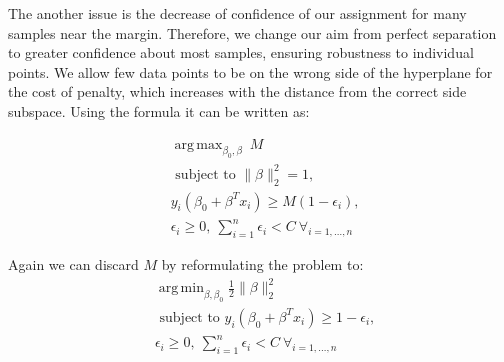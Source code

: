 \documentclass[12pt, wide]{mwart}
\DeclareMathOperator*{\argmax}{arg\,max}
\DeclareMathOperator*{\argmin}{arg\,min}
\begin{document}
The another issue is the decrease of confidence of our assignment for many samples near the margin. Therefore, we change our aim from perfect separation to greater confidence about most samples, ensuring robustness to individual points. We allow few data points to be on the wrong side of the hyperplane for the cost of penalty, which increases with the distance from the correct side subspace. Using the formula it can be written as:

\begin{align*}
&{\argmax_{\beta_{0}, \beta} \ M} \\ &{\text { subject to } \|\beta\|_2^2 = 1}, \\ &y_{i}\left(\beta_{0}+\beta^T x_i\right) \geq M(1 - \epsilon_i), \\
& \epsilon_i \geq 0, \ \sum_{i=1}^n \epsilon_i < C \ \forall_{i=1, \ldots, n}
\end{align*}

Again we can discard $M$ by reformulating the problem to:
\begin{align*}
& \argmin_{\beta, \beta_0} \frac{1}{2}\|\beta\|^2_2 \\ &{\text { subject to }} y_{i}\left(\beta_{0}+\beta^T x_i\right) \geq 1 - \epsilon_i, \\ &\epsilon_i \geq 0, \ \sum_{i=1}^n \epsilon_i < C \ \forall_{i=1, \ldots, n}
\end{align*}
\end{document}
